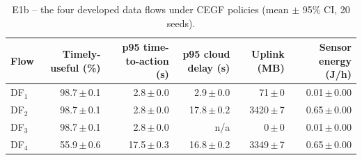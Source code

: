 \begin{table}[htbp]\scriptsize\centering
\caption{E1b -- the four developed data flows under CEGF policies (mean $\pm$ 95\% CI, 20 seeds).}\label{tab:e1-flows}
\begin{tabular}{lrrrrr}
\toprule
Flow & Timely-useful (\%) & p95 time-to-action (s) & p95 cloud delay (s) & Uplink (MB) & Sensor energy (J/h) \\
\midrule
DF$_1$ & 98.7\,$\pm$\,0.1 & 2.8\,$\pm$\,0.0 & 2.9\,$\pm$\,0.0 & 71\,$\pm$\,0 & 0.01\,$\pm$\,0.00 \\
DF$_2$ & 98.7\,$\pm$\,0.1 & 2.8\,$\pm$\,0.0 & 17.8\,$\pm$\,0.2 & 3420\,$\pm$\,7 & 0.65\,$\pm$\,0.00 \\
DF$_3$ & 98.7\,$\pm$\,0.1 & 2.8\,$\pm$\,0.0 & n/a & 0\,$\pm$\,0 & 0.01\,$\pm$\,0.00 \\
DF$_4$ & 55.9\,$\pm$\,0.6 & 17.5\,$\pm$\,0.3 & 16.8\,$\pm$\,0.2 & 3349\,$\pm$\,7 & 0.65\,$\pm$\,0.00 \\
\bottomrule
\end{tabular}
\end{table}